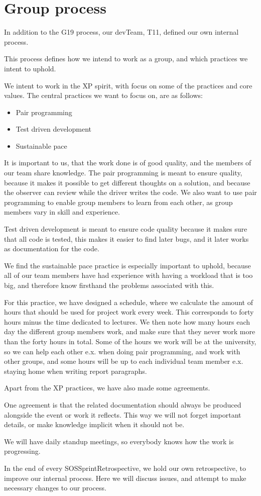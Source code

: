 \section{Group process}

In addition to the \gls{G19} process, our \gls{devTeam}, \gls{T11}, defined our own internal process.

This process defines how we intend to work as a group, and which practices we intent to uphold.

We intent to work in the \gls{XP} spirit, with focus on some of the practices and core values.
The central practices we want to focus on, are as follows:
\begin{itemize}
    \item Pair programming
    \item Test driven development
    \item Sustainable pace
\end{itemize}

It is important to us, that the work done is of good quality, and the members of our team share knowledge. The pair programming is meant to ensure quality, because it makes it possible to get different thoughts on a solution, and because the observer can review while the \gls{driver} writes the code. We also want to use pair programming to enable group members to learn from each other, as group members vary in skill and experience.

Test driven development is meant to ensure code quality because it makes sure that all code is tested, this makes it easier to find later bugs, and it later works as documentation for the code.

We find the sustainable pace practice is especially important to uphold, because all of our team members have had experience with having a workload that is too big, and therefore know firsthand the problems associated with this.

For this practice, we have designed a schedule, where we calculate the amount of hours that should be used for project work every week. This corresponds to forty hours minus the time dedicated to lectures. We then note how many hours each day the different group members work, and make sure that they never work more than the forty hours in total. Some of the hours we work will be at the university, so we can help each other e.x. when doing pair programming, and work with other groups, and some hours will be up to each individual team member e.x. staying home when writing report paragraphs.

Apart from the \gls{XP} practices, we have also made some agreements.

One agreement is that the related documentation should always be produced alongside the event or work it reflects. This way we will not forget important details, or make knowledge implicit when it should not be.

We will have daily standup meetings, so everybody knows how the work is progressing.

In the end of every \gls{SOSSprintRetrospective}, we hold our own retrospective, to improve our internal process. Here we will discuss issues, and attempt to make necessary changes to our process.
